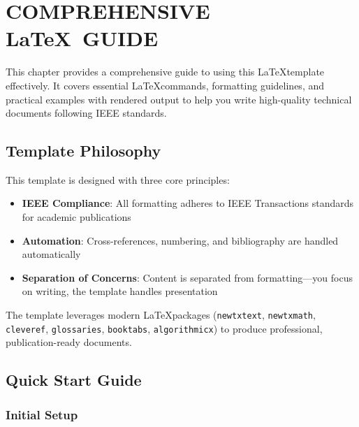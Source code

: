 
\chapter{COMPREHENSIVE \LaTeX~GUIDE}
This chapter provides a comprehensive guide to using this \LaTeX template effectively. It covers essential \LaTeX commands, formatting guidelines, and practical examples with rendered output to help you write high-quality technical documents following IEEE standards.

\section*{Template Philosophy}

This template is designed with three core principles:

\begin{itemize}
    \item \textbf{IEEE Compliance}: All formatting adheres to IEEE Transactions standards for academic publications
    \item \textbf{Automation}: Cross-references, numbering, and bibliography are handled automatically
    \item \textbf{Separation of Concerns}: Content is separated from formatting---you focus on writing, the template handles presentation
\end{itemize}

The template leverages modern \LaTeX packages (\texttt{newtxtext}, \texttt{newtxmath}, \texttt{cleveref}, \texttt{glossaries}, \texttt{booktabs}, \texttt{algorithmicx}) to produce professional, publication-ready documents.

\section*{Quick Start Guide}

\subsection*{Initial Setup}

